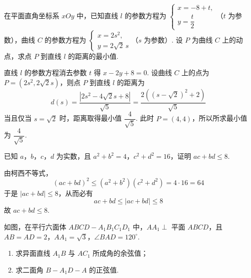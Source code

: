 \reuseproblemnumber
\begin{problem}[C]
在平面直角坐标系 \(xOy\) 中，已知直线 \(l\) 的参数方程为
\(\begin{cases}
x=-8+t,\\
y=\dfrac{t}{2}
\end{cases}\)（\(t\) 为参数），曲线 \(C\) 的参数方程为
\(\begin{cases}
x=2s^2,\\
y=2\sqrt2\,s
\end{cases}\)（\(s\) 为参数）. 设 \(P\) 为曲线 \(C\) 上的动点，求点 \(P\) 到直线 \(l\) 的距离的最小值.
\end{problem}

\begin{solution}
直线 \(l\) 的参数方程消去参数 \(t\) 得 \(x-2y+8=0\). 设曲线 \(C\) 上的点为 \(P=(2s^2,2\sqrt2s)\)，则点 \(P\) 到直线 \(l\) 的距离为
\[
d(s)=\dfrac{\left|2s^2-4\sqrt2s+8\right|}{\sqrt5}=\dfrac{2\left((s-\sqrt2)^2+2\right)}{\sqrt5}
\]
当且仅当 \(s=\sqrt2\) 时，距离取得最小值 \(\dfrac4{\sqrt5}\). 此时 \(P=(4,4)\)，所以所求最小值为 \(\dfrac4{\sqrt5}\).
\end{solution}


\reuseproblemnumber
\begin{problem}[D]
已知 \(a\)，\(b\)，\(c\)，\(d\) 为实数，且 \(a^2+b^2=4\)，\(c^2+d^2=16\)，证明 \(ac+bd\le 8\).
\end{problem}

\begin{solution}
由柯西不等式，
\[
(ac+bd)^2\le(a^2+b^2)(c^2+d^2)=4\cdot16=64
\]
于是 \(\lvert ac+bd\rvert\le8\)，从而必有
\[
ac+bd\le\lvert ac+bd\rvert\le8
\]
故 \(ac+bd\le8\).
\end{solution}




\begin{problem}
如图，在平行六面体 \(ABCD-A_1B_1C_1D_1\) 中，\(AA_1\perp\) 平面 \(ABCD\)，且 \(AB=AD=2\)，\(AA_1=\sqrt3\)，\(\angle BAD=120^\circ\).

\begin{enumerate}
\item 求异面直线 \(A_1B\) 与 \(AC_1\) 所成角的余弦值；
\item 求二面角 \(B-A_1D-A\) 的正弦值.
\end{enumerate}

\end{problem}

